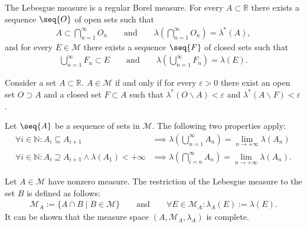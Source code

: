     \begin{property}
        The Lebesgue measure is a regular Borel measure. For every $A\subset\mathbb{R}$ there exists a sequence $\seq{O}$ of open sets such that
        \begin{gather}
            \label{lebesgue:open_cover_existence}
            A\subset\bigcap_{n=1}^\infty O_n\qquad\text{and}\qquad\lambda\left(\bigcap_{n=1}^\infty O_n\right) = \lambda^*(A),
        \end{gather}
        and for every $E\in\mathcal{M}$ there exists a sequence $\seq{F}$ of closed sets such that
        \begin{gather}
            \label{lebesgue:closed_cover_existence}
            \bigcup_{n=1}^\infty F_n\subset E\qquad\text{and}\qquad\lambda\left(\bigcup_{n=1}^\infty F_n\right) = \lambda(E).
        \end{gather}
    \end{property}

    \begin{property}
        Consider a set $A\subset\mathbb{R}$. $A\in\mathcal{M}$ if and only if for every $\varepsilon>0$ there exist an open set $O\supset A$ and a closed set $F\subset A$ such that $\lambda^*(O\backslash A) < \varepsilon$ and $\lambda^*(A\backslash F)<\varepsilon$.
    \end{property}

    \begin{property}
        Let $\seq{A}$ be a sequence of sets in $\mathcal{M}$. The following two properties apply:
        \begin{align}
            \forall i\in\mathbb{N}:A_i\subseteq A_{i+1} &\implies \lambda\left(\bigcup_{n=1}^\infty A_n\right) = \lim_{n\rightarrow+\infty}\lambda(A_n)\\
            \forall i\in\mathbb{N}:A_i\supseteq A_{i+1}\land\lambda(A_1)<+\infty &\implies \lambda\left(\bigcap_{i=n}^\infty A_n\right) = \lim_{n\rightarrow+\infty}\lambda(A_n).
        \end{align}
    \end{property}

    \begin{construct}[Restriction]\label{lebesgue:restricted_lebesgue_measure}
        Let $A\in\mathcal{M}$ have nonzero measure. The restriction of the Lebesgue measure to the set $B$ is defined as follows:
        \begin{gather}
            \mathcal{M}_A := \{A\cap B\mid B\in\mathcal{M}\} \qquad\text{and}\qquad \forall E\in\mathcal{M}_A:\lambda_A(E) := \lambda(E).
        \end{gather}
        It can be shown that the measure space $(A,\mathcal{M}_A,\lambda_A)$ is complete.
    \end{construct}

